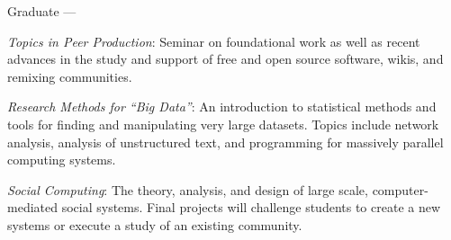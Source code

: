 \documentclass[10pt]{memoir}
\newenvironment{enumerate*}%
  {\begin{enumerate}%
    \setlength{\itemsep}{0pt}%
    \setlength{\parskip}{0pt}}%
  {\end{enumerate}}
\begin{document}
Graduate ---
\begin{enumerate*}
\item \emph{Topics in Peer Production}: Seminar on foundational work
  as well as recent advances in the study and support of free and open
  source software, wikis, and remixing communities.
\item \emph{Research Methods for ``Big Data''}: An introduction to
  statistical methods and tools for finding and manipulating very
  large datasets. Topics include network analysis, analysis of
  unstructured text, and programming for massively parallel computing
  systems.
\item \emph{Social Computing}: The theory, analysis, and design of
  large scale, computer-mediated social systems. Final projects will
  challenge students to create a new systems or execute a study of an
  existing community.
\end{enumerate*}
\end{document}
